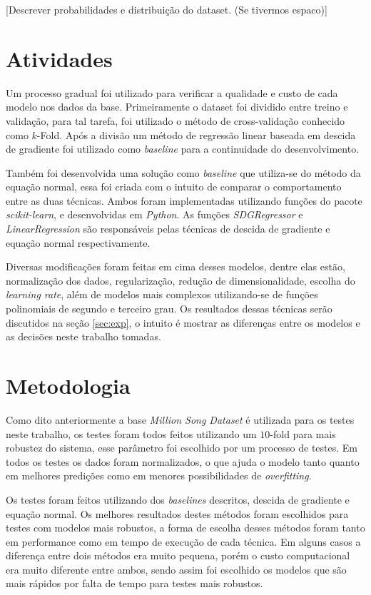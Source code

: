 \documentclass[conference]{IEEEtran}
\begin{document}
[Descrever probabilidades e distribuição do dataset. (Se tivermos espaco)]

\section{Atividades} \label{sec:ativ}

Um processo gradual foi utilizado para verificar a qualidade e custo de cada modelo nos dados da base. Primeiramente o dataset foi dividido entre treino e validação, para tal tarefa, foi utilizado o método de cross-validação conhecido como $k$-Fold. Após a divisão um método de regressão linear baseada em descida de gradiente foi utilizado como \emph{baseline} para a continuidade do desenvolvimento.

Também foi desenvolvida uma solução como \emph{baseline} que utiliza-se do método da equação normal, essa foi criada com o intuito de comparar o comportamento entre as duas técnicas. Ambos foram implementadas utilizando funções do pacote \emph{scikit-learn}, e desenvolvidas em \emph{Python}. As funções \emph{SDGRegressor} e \emph{LinearRegression} são responsáveis pelas técnicas de descida de gradiente e equação normal respectivamente.

Diversas modificações foram feitas em cima desses modelos, dentre elas estão, normalização dos dados, regularização, redução de dimensionalidade, escolha do \emph{learning rate}, além de modelos mais complexos utilizando-se de funções polinomiais de segundo e terceiro grau. Os resultados dessas técnicas serão discutidos na seção \ref{sec:exp}, o intuito é mostrar as diferenças entre os modelos e as decisões neste trabalho tomadas.

\section{Metodologia} \label{sec:meto}

Como dito anteriormente a base \emph{Million Song Dataset} é utilizada para os testes neste trabalho, os testes foram todos feitos utilizando um $10$-fold para mais robustez do sistema, esse parâmetro foi escolhido por um processo de testes. Em todos os testes os dados foram normalizados, o que ajuda o modelo tanto quanto em melhores predições como em menores possibilidades de \emph{overfitting}.

Os testes foram feitos utilizando dos \emph{baselines} descritos, descida de gradiente e equação normal. Os melhores resultados destes métodos foram escolhidos para testes com modelos mais robustos, a forma de escolha desses métodos foram tanto em performance como em tempo de execução de cada técnica. Em alguns casos a diferença entre dois métodos era muito pequena, porém o custo computacional era muito diferente entre ambos, sendo assim foi escolhido os modelos que são mais rápidos por falta de tempo para testes mais robustos.
\end{document}
